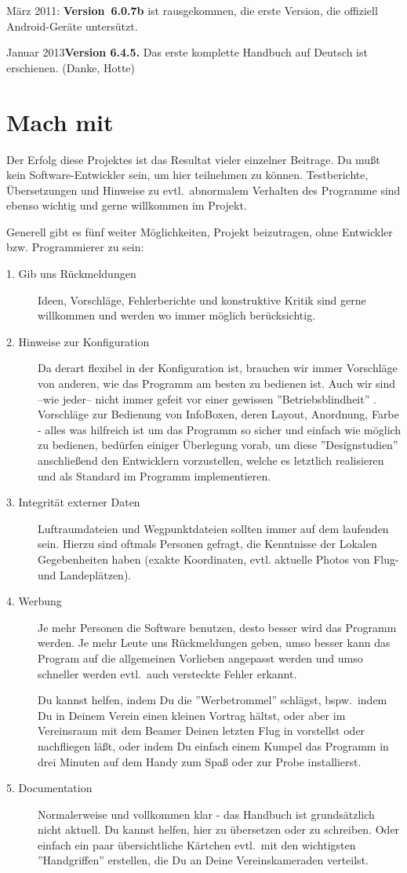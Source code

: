 März 2011: {\bf Version~6.0.7b} ist rausgekommen, die erste Version, die offiziell  Android-Geräte untersützt.

Januar 2013{\bf Version 6.4.5.} Das erste komplette Handbuch auf Deutsch ist erschienen. (Danke, Hotte)

\section{Mach mit}

Der Erfolg diese Projektes ist das Resultat vieler einzelner Beitrage. Du mußt kein Software-Entwickler sein, um hier teilnehmen zu können.
Testberichte, Übersetzungen und Hinweise zu evtl.\ abnormalem Verhalten des Programme sind ebenso wichtig und gerne willkommen
im Projekt.

Generell gibt es fünf weiter Möglichkeiten, Projekt beizutragen, ohne Entwickler bzw. Programmierer zu sein:

\begin{description}
\item[1. Gib uns Rückmeldungen] Ideen, Vorschläge, Fehlerberichte und konstruktive Kritik sind gerne willkommen und werden
wo immer möglich berücksichtig.
\item[2. Hinweise zur Konfiguration] Da \xc derart flexibel in der Konfiguration ist, brauchen wir immer Vorschläge von anderen, wie
das Programm am besten zu bedienen ist. Auch wir sind --wie jeder-- nicht immer gefeit vor einer gewissen ''Betriebsblindheit'' .
Vorschläge zur Bedienung von InfoBoxen, deren Layout, Anordnung, Farbe - alles was hilfreich ist um das Programm so sicher
und einfach wie möglich zu bedienen, bedürfen einiger Überlegung vorab, um diese ''Designstudien'' anschließend den Entwicklern
vorzustellen, welche es letztlich realisieren und als Standard im Programm implementieren.
\item[3. Integrität externer Daten] Luftraumdateien und Wegpunktdateien sollten immer auf dem laufenden sein.
Hierzu sind oftmals Personen gefragt, die Kenntnisse der Lokalen Gegebenheiten haben (exakte Koordinaten, evtl. aktuelle Photos von Flug- und Landeplätzen).
\item[4. Werbung]  Je mehr Personen die Software benutzen, desto besser wird das Programm werden. Je mehr Leute uns Rückmeldungen geben, umso
besser kann das Program auf die allgemeinen Vorlieben angepasst werden und umso schneller werden evtl.\ auch versteckte Fehler erkannt.

Du kannst helfen, indem Du die ''Werbetrommel'' schlägst, bspw.\ indem Du in Deinem Verein einen kleinen Vortrag hältst, oder aber im Vereinsraum mit
dem Beamer Deinen letzten Flug in \xc vorstellst oder nachfliegen läßt, oder indem Du einfach einem Kumpel das Programm in drei Minuten auf
dem Handy zum Spaß oder zur Probe installierst.
\item[5. Documentation]  Normalerweise und vollkommen klar - das Handbuch ist grundsätzlich nicht aktuell. Du kannst helfen, hier zu übersetzen oder zu
schreiben. Oder einfach ein paar übersichtliche Kärtchen evtl.\ mit den wichtigsten ''Handgriffen'' erstellen, die Du an Deine Vereinskameraden
verteilst.
\end{description}

